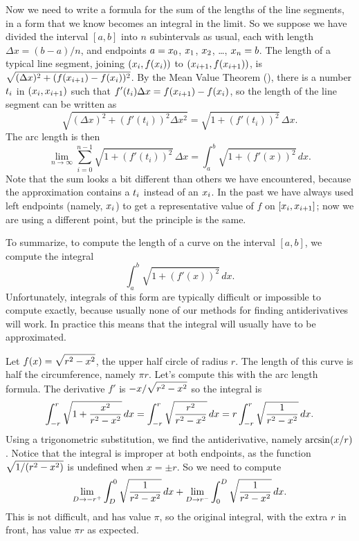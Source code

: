 Now we need to write a formula for the sum of the lengths of the line
segments, in a form that we know becomes an integral in the limit.  So
we suppose we have divided the interval $[a,b]$ into $n$ subintervals
as usual, each with length $\Delta x =(b-a)/n$, and endpoints $\displaystyle
a=x_0$, $\displaystyle x_1$, $\displaystyle x_2$, \dots, $\displaystyle x_n=b$.  The length of a
typical line segment, joining $\displaystyle (x_i,f(x_i))$ to $\displaystyle
(x_{i+1},f(x_{i+1}))$, is $\displaystyle\sqrt{(\Delta x )^2
  +(f(x_{i+1})-f(x_i))^2}$.  By the Mean Value Theorem
(), there is a number $\displaystyle t_i$ in $\displaystyle (x_i,x_{i+1})$
such that $\displaystyle f'(t_i)\Delta x=f(x_{i+1})-f(x_i)$, so the length of
the line segment can be written as
$$
  \sqrt{(\Delta x)^2 + (f'(t_i))^2\Delta x^2}=
  \sqrt{1+(f'(t_i))^2}\,\Delta x.
$$
The arc length is then
$$
  \lim_{n\to\infty}\sum_{i=0}^{n-1} \sqrt{1+(f'(t_i))^2}\,\Delta x=
  \int_a^b \sqrt{1+(f'(x))^2}\,dx.
$$
Note that the sum looks a bit different than others we have
encountered, because the approximation contains a $\displaystyle t_i$ instead of an
$\displaystyle x_i$. In the past we have always used left endpoints (namely, $\displaystyle x_i$)
to get a representative value of $f$ on $\displaystyle [x_i,x_{i+1}]$; now we are
using a different point, but the principle is the same.

To summarize, to compute the length of a curve on the interval
$[a,b]$, we compute the integral
$$\int_a^b \sqrt{1+(f'(x))^2}\,dx.$$ 
Unfortunately, integrals of this form are typically difficult or
impossible to compute exactly, because usually none of our methods for
finding antiderivatives will work. In practice this means that the
integral will usually have to be approximated.


\example Let $\displaystyle f(x) = \sqrt{r^2-x^2}$, the upper half circle of radius
$r$. The length of this curve is half the circumference, namely $\pi
r$. Let's compute this with the arc length formula.
The derivative $f'$ is $\displaystyle \displaystyle -x/\sqrt{r^2-x^2}$ so the integral is
$$
  \int_{-r}^r \sqrt{1+{x^2\over r^2-x^2}}\,dx
  =\int_{-r}^r \sqrt{r^2\over r^2-x^2}\,dx
  =r\int_{-r}^r \sqrt{1\over r^2-x^2}\,dx.
$$
Using a trigonometric substitution, we find the antiderivative, namely
$\displaystyle \arcsin(x/r)$. Notice that the integral is improper at both
endpoints, as the function $\displaystyle \sqrt{1/(r^2-x^2)}$ is undefined when
$x=\pm r$. So we need to compute
$$
  \lim_{D\to-r^+}\int_D^0  \sqrt{1\over r^2-x^2}\,dx +
  \lim_{D\to r^-}\int_0^D  \sqrt{1\over r^2-x^2}\,dx.
$$
This is not difficult, and has value $\pi$, so the original integral,
with the extra $r$ in front, has value $\pi r$ as expected.
\endexample

